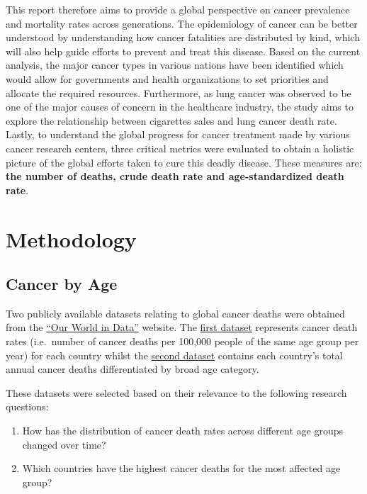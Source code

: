 \documentclass[11pt,a4paper,]{article}
\providecommand{\tightlist}{%
  \setlength{\itemsep}{0pt}\setlength{\parskip}{0pt}}
\begin{document}
This report therefore aims to provide a global perspective on cancer prevalence and mortality rates across generations. The epidemiology of cancer can be better understood by understanding how cancer fatalities are distributed by kind, which will also help guide efforts to prevent and treat this disease. Based on the current analysis, the major cancer types in various nations have been identified which would allow for governments and health organizations to set priorities and allocate the required resources. Furthermore, as lung cancer was observed to be one of the major causes of concern in the healthcare industry, the study aims to explore the relationship between cigarettes sales and lung cancer death rate. Lastly, to understand the global progress for cancer treatment made by various cancer research centers, three critical metrics were evaluated to obtain a holistic picture of the global efforts taken to cure this deadly disease. These measures are: \textbf{the number of deaths, crude death rate and age-standardized death rate}.

\hypertarget{methodology}{%
\section{Methodology}\label{methodology}}

\hypertarget{cancer-by-age}{%
\subsection{Cancer by Age}\label{cancer-by-age}}

Two publicly available datasets relating to global cancer deaths were obtained from the \href{https://ourworldindata.org/cancer}{``Our World in Data''} website. The \href{https://ourworldindata.org/grapher/cancer-death-rates-by-age}{first dataset} represents cancer death rates (i.e.~number of cancer deaths per 100,000 people of the same age group per year) for each country whilst the \href{https://ourworldindata.org/grapher/cancer-deaths-by-age?stackMode=relative}{second dataset} contains each country's total annual cancer deaths differentiated by broad age category.

These datasets were selected based on their relevance to the following research questions:

\begin{enumerate}
\def\labelenumi{\arabic{enumi}.}
\tightlist
\item
  How has the distribution of cancer death rates across different age groups changed over time?
\item
  Which countries have the highest cancer deaths for the most affected age group?
\end{enumerate}
\end{document}
